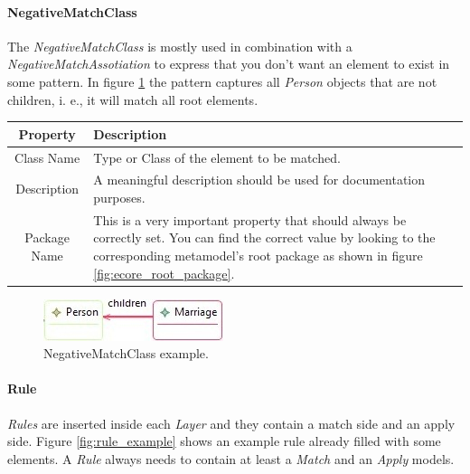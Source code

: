 \paragraph{NegativeMatchClass}

The \emph{NegativeMatchClass} is mostly used in combination with a
\emph{NegativeMatchAssotiation} to express that you don't want an element to
exist in some pattern. In figure \ref{fig:negative_marriage_example} the pattern
captures all \emph{Person} objects that are not children, i. e., it will match
all root elements.


\begin{center}
  \begin{tabular}{ | c | p{\paragraphsize} | }
    \hline
    \textbf{Property} & \textbf{Description} \\ \hline
    Class Name & Type or Class of the element to be matched.  \\ \hline
    Description & A meaningful description should be used for documentation
  purposes. \\ \hline
    Package Name & This is a very important property that should always be
  correctly set. You can find the
  correct value by looking to the corresponding metamodel's root package as
  shown in figure \ref{fig:ecore_root_package}. \\ \hline
  \end{tabular}
\end{center}


\begin{figure}[h]
\begin{center}
  \includegraphics[scale=0.7]{imgs/negative_marriage_example.jpg}
  \caption{NegativeMatchClass example.}
  \label{fig:negative_marriage_example}
\end{center}
\end{figure}



\paragraph{Rule}

\emph{Rules} are inserted inside each \emph{Layer} and they contain a match side
and an apply side. Figure \ref{fig:rule_example} shows an example rule already
filled with some elements. A \emph{Rule} always needs to contain at least a
\emph{Match} and an \emph{Apply} models.

